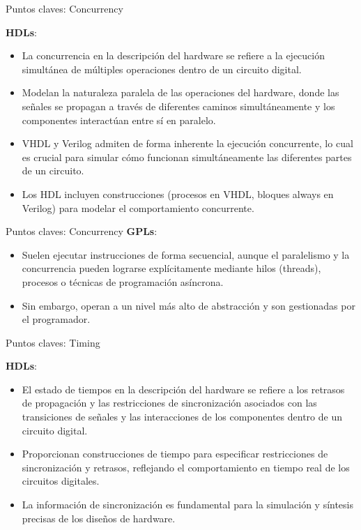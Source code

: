 \documentclass[11pt]{beamer}
\begin{document}
\begin{frame}{Puntos claves: Concurrency}

	\textbf{HDLs}:
	\begin{itemize}
		\item La concurrencia en la descripción del hardware se refiere a la ejecución simultánea de múltiples operaciones dentro de un circuito digital.
		\item Modelan la naturaleza paralela de las operaciones del hardware, donde las señales se propagan a través de diferentes caminos simultáneamente y los componentes interactúan entre sí en paralelo.
		\item VHDL y Verilog admiten de forma inherente la ejecución concurrente, lo cual es crucial para simular cómo funcionan simultáneamente las diferentes partes de un circuito.
		\item Los HDL incluyen construcciones (procesos en VHDL, bloques always en Verilog) para modelar el comportamiento concurrente.
	\end{itemize}
\end{frame}

\begin{frame}{Puntos claves: Concurrency}
	\textbf{GPLs}:
	\begin{itemize}
		\item Suelen ejecutar instrucciones de forma secuencial, aunque el paralelismo y la concurrencia pueden lograrse explícitamente mediante hilos (threads), procesos o técnicas de programación asíncrona.
		\item Sin embargo, operan a un nivel más alto de abstracción y son gestionadas por el programador.
	\end{itemize}
\end{frame}

\begin{frame}{Puntos claves: Timing}
	
	\textbf{HDLs}:
	\begin{itemize}
		\item El estado de tiempos en la descripción del hardware se refiere a los retrasos de propagación y las restricciones de sincronización asociados con las transiciones de señales y las interacciones de los componentes dentro de un circuito digital.
		\item Proporcionan construcciones de tiempo para especificar restricciones de sincronización y retrasos, reflejando el comportamiento en tiempo real de los circuitos digitales.
		\item La información de sincronización es fundamental para la simulación y síntesis precisas de los diseños de hardware. 
	\end{itemize}
\end{frame}
\end{document}
